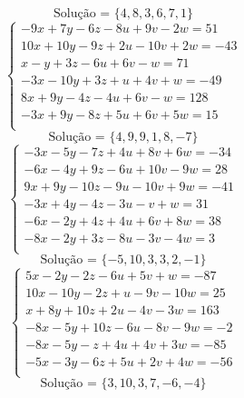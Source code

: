 \documentclass[12pt,oneside,a4paper]{article}
\begin{document}
\begin{equation*}
\text{Solução = }\{4,8,3,6,7,1\}
\end{equation*}
\vspace{\baselineskip}
\begin{equation*}
\begin{cases}
-9x+7y-6z-8u+9v-2w=51 \\
10x+10y-9z+2u-10v+2w=-43 \\
x-y+3z-6u+6v-w=71 \\
-3x-10y+3z+u+4v+w=-49 \\
8x+9y-4z-4u+6v-w=128 \\
-3x+9y-8z+5u+6v+5w=15 \\
\end{cases}
\end{equation*}
\begin{equation*}
\text{Solução = }\{4,9,9,1,8,-7\}
\end{equation*}
\vspace{\baselineskip}
\begin{equation*}
\begin{cases}
-3x-5y-7z+4u+8v+6w=-34 \\
-6x-4y+9z-6u+10v-9w=28 \\
9x+9y-10z-9u-10v+9w=-41 \\
-3x+4y-4z-3u-v+w=31 \\
-6x-2y+4z+4u+6v+8w=38 \\
-8x-2y+3z-8u-3v-4w=3 \\
\end{cases}
\end{equation*}
\begin{equation*}
\text{Solução = }\{-5,10,3,3,2,-1\}
\end{equation*}
\vspace{\baselineskip}
\begin{equation*}
\begin{cases}
5x-2y-2z-6u+5v+w=-87 \\
10x-10y-2z+u-9v-10w=25 \\
x+8y+10z+2u-4v-3w=163 \\
-8x-5y+10z-6u-8v-9w=-2 \\
-8x-5y-z+4u+4v+3w=-85 \\
-5x-3y-6z+5u+2v+4w=-56 \\
\end{cases}
\end{equation*}
\begin{equation*}
\text{Solução = }\{3,10,3,7,-6,-4\}
\end{equation*}
\end{document}
